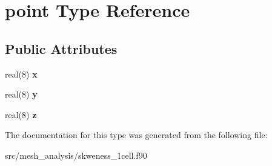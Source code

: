 \hypertarget{structpoint}{\section{point Type Reference}
\label{structpoint}
}
\subsection*{Public Attributes}
\begin{DoxyCompactItemize}
\item 
\hypertarget{structpoint_a951eb781c58e648afe164ee12c8f8183}{real(8) {\bfseries x}}\label{structpoint_a951eb781c58e648afe164ee12c8f8183}

\item 
\hypertarget{structpoint_a2e82bc57503da71cc5be625828d18ca1}{real(8) {\bfseries y}}\label{structpoint_a2e82bc57503da71cc5be625828d18ca1}

\item 
\hypertarget{structpoint_aea3f5f7b2b2afbf7f9d828b8b52ea82a}{real(8) {\bfseries z}}\label{structpoint_aea3f5f7b2b2afbf7f9d828b8b52ea82a}

\end{DoxyCompactItemize}


The documentation for this type was generated from the following file\-:\begin{DoxyCompactItemize}
\item 
src/mesh\-\_\-analysis/skweness\-\_\-1cell.\-f90\end{DoxyCompactItemize}
